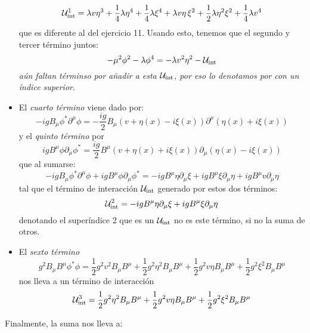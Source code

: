 \begin{itemize}
	\begin{equation}
		\mathcal{U}^1_{\text{int}} =  \lambda v\eta^3 + \frac{1}{4}\lambda\eta^4
	+ \frac{1}{4}\lambda\xi^4 + \lambda v\eta\,\xi^2 + \frac{1}{2}\lambda \eta^2\xi^2 + \frac{1}{4}\lambda v^4
	\end{equation}
	que es diferente al del ejercicio 11. Usando esto, tenemos que el segundo y tercer término juntos: 
	\begin{equation}
		- \mu^2 \phi^2 -\lambda \phi^4   = - \lambda v^2 \eta^2  - \mathcal{U}_{\text{int}}
	\end{equation}
	\textit{aún faltan términso por añadir a esta $\mathcal{U}_{\text{int}}$, por eso lo denotamos por con un índice superior}. 
	\item El \textit{cuarto término} viene dado por: 
	\begin{equation}
		- i g B_\mu \phi^* \partial^\mu \phi = - \frac{i g}{2} B_\mu (v + \eta(x) - i \xi(x)) \partial^{\mu}(\eta(x) + i \xi(x))
	\end{equation}
	y el \textit{quinto término} por 
	\begin{equation}
		i g B^\mu \phi \partial_\mu \phi^* = \frac{i g}{2} B^\mu  (v + \eta(x) + i \xi(x)) \partial_{\mu}(\eta(x) - i \xi(x)) 
	\end{equation}
	que al sumarse: 
	\begin{equation}
		- i g B_\mu \phi^* \partial^\mu \phi + i g B^\mu \phi \partial_\mu \phi^* = - i g  B^\mu \eta \partial_\mu \xi + i g B^\mu \xi \partial_\mu \eta+ i g B^\mu v \partial_\mu \eta
	\end{equation}
	tal que el término de interacción $\mathcal{U}_{\text{int}}$ generado por estos dos términos: 
	\begin{equation}
		\mathcal{U}^2_{\text{int}} =  - i g  B^\mu \eta \partial_\mu \xi + i g B^\mu \xi \partial_\mu \eta
	\end{equation}
	denotando el superíndice 2 que es un $\mathcal{U}_{\text{int}}$ no es este término, si no la suma de otros.

	\item El \textit{sexto término}
	\begin{equation}
		g^2 B_\mu B^\mu \phi^* \phi  =  
		\frac{1}{2}g^2 v^2 B_\mu B^\mu  +
		\frac{1}{2}g^2  \eta^2 B_\mu B^\mu +
		\frac{1}{2}g^2 v \eta  B_\mu B^\mu +
		\frac{1}{2}g^2  \xi^2 B_\mu B^\mu 
	\end{equation}
	nos lleva a un término de interacción
	\begin{equation}
		\mathcal{U}_{\text{int}}^3 = \frac{1}{2}g^2  \eta^2 B_\mu B^\mu +
		\frac{1}{2}g^2 v \eta  B_\mu B^\mu +
		\frac{1}{2}g^2  \xi^2 B_\mu B^\mu 
	\end{equation}
\end{itemize}
Finalmente, la suma nos lleva a: 

